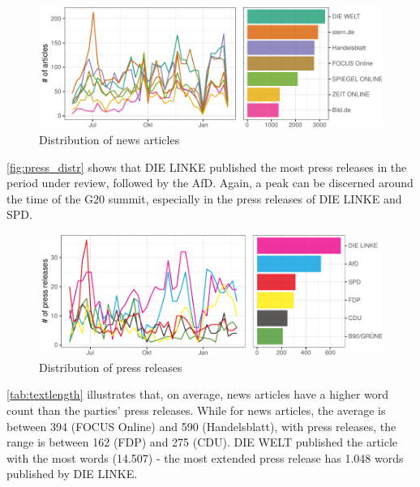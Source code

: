 \documentclass[
  12pt,
]{article}
\begin{document}
\begin{figure}

{\centering \includegraphics[width=0.8\linewidth]{main_text_files/figure-latex/Distribution of news articles-1} 

}

\caption{Distribution of news articles \label{fig:news_distr}}\label{fig:Distribution of news articles}
\end{figure}

\autoref{fig:press_distr} shows that DIE LINKE published the most press
releases in the period under review, followed by the AfD. Again, a peak
can be discerned around the time of the G20 summit, especially in the
press releases of DIE LINKE and SPD.

\begin{figure}

{\centering \includegraphics[width=0.8\linewidth]{main_text_files/figure-latex/Distribution of press releases-1} 

}

\caption{Distribution of press releases \label{fig:press_distr}}\label{fig:Distribution of press releases}
\end{figure}

\autoref{tab:textlength} illustrates that, on average, news articles
have a higher word count than the parties' press releases. While for
news articles, the average is between 394 (FOCUS Online) and 590
(Handelsblatt), with press releases, the range is between 162 (FDP) and
275 (CDU). DIE WELT published the article with the most words (14.507) -
the most extended press release has 1.048 words published by DIE LINKE.
\end{document}
